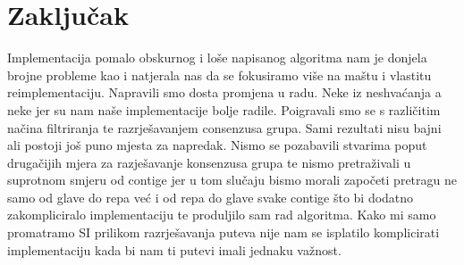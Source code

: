 \chapter{Zaklju\v{c}ak}


Implementacija pomalo obskurnog i loše napisanog algoritma nam je donjela brojne probleme kao i natjerala nas da se fokusiramo više na maštu i vlastitu reimplementaciju. Napravili smo dosta promjena u radu. Neke iz neshvaćanja a neke jer su nam naše implementacije bolje radile. Poigravali smo se s različitim načina filtriranja te razrješavanjem consenzusa grupa. Sami rezultati nisu bajni ali postoji još puno mjesta za napredak. Nismo se pozabavili stvarima poput drugačijih mjera za razješavanje konsenzusa grupa te nismo pretraživali u suprotnom smjeru od contige jer u tom slučaju bismo morali započeti pretragu ne samo od glave do repa već i od repa do glave svake contige što bi dodatno zakompliciralo implementaciju te produljilo sam rad algoritma. Kako mi samo promatramo SI prilikom razrješavanja puteva nije nam se isplatilo komplicirati implementaciju kada bi nam ti putevi imali jednaku važnost.  


